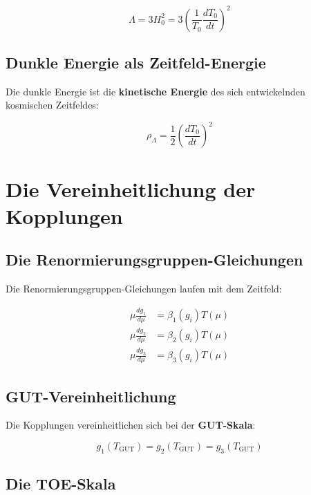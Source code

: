 \documentclass[12pt,a4paper]{report}
\begin{document}
	\begin{equation}
		\Lambda = 3H_0^2 = 3\left(\frac{1}{T_0}\frac{dT_0}{dt}\right)^2
	\end{equation}
	
	\subsection{Dunkle Energie als Zeitfeld-Energie}
	
	Die dunkle Energie ist die \textbf{kinetische Energie} des sich entwickelnden kosmischen Zeitfeldes:
	
	\begin{equation}
		\rho_{\Lambda} = \frac{1}{2}\left(\frac{dT_0}{dt}\right)^2
	\end{equation}
	
	\section{Die Vereinheitlichung der Kopplungen}
	
	\subsection{Die Renormierungsgruppen-Gleichungen}
	
	Die Renormierungsgruppen-Gleichungen laufen mit dem Zeitfeld:
	
	\begin{align}
		\mu\frac{dg_1}{d\mu} &= \beta_1(g_i)T(\mu) \\
		\mu\frac{dg_2}{d\mu} &= \beta_2(g_i)T(\mu) \\
		\mu\frac{dg_3}{d\mu} &= \beta_3(g_i)T(\mu)
	\end{align}
	
	\subsection{GUT-Vereinheitlichung}
	
	Die Kopplungen vereinheitlichen sich bei der \textbf{GUT-Skala}:
	
	\begin{equation}
		g_1(T_{\text{GUT}}) = g_2(T_{\text{GUT}}) = g_3(T_{\text{GUT}})
	\end{equation}
	
	\subsection{Die TOE-Skala}
	
\end{document}
